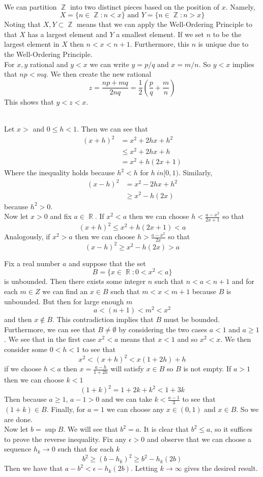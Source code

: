 \documentclass{article}
\DeclareMathOperator{\Z}{\mathbb{Z}}
\DeclareMathOperator{\R}{\mathbb{R}}
\newcommand{\problem}[1]{\noindent{\textbf{Problem #1}}\\}
\newcommand{\problempart}[1]{\noindent{\textbf{(#1)}}}
\begin{document}
\problem{9}
\problempart{b} We can partition $\Z$ into two distinct pieces based on the position of $x$. Namely,
\[
X = \{n \in \Z : n < x\} \text{ and } Y = \{n \in \Z : n > x\}
\]
Noting that $X,Y \subset \Z$ means that we can apply the Well-Ordering Principle to that $X$ has a largest element and $Y$ a smallest element. If we set $n$ to be the largest element in $X$ then $n<x<n+1$. Furthermore, this $n$ is unique due to the Well-Ordering Principle. \\
\problempart{d} For $x,y$ rational and $y < x$ we can write $y = p/q$ and $x = m/n$. So $y < x$ implies that $np < mq$. We then create the new rational 
\[
z = \frac{np+mq}{2nq} = \frac{1}{2}(\frac{p}{q} + \frac{m}{n})
\]
This shows that $y < z < x$.

\problem{10}
\problempart{a} Let $x >$ and $0 \leq h < 1$. Then we can see that
\begin{align*}
(x+h)^2 &= x^2 + 2hx + h^2 \\
&\leq x^2 + 2hx + h \\
&= x^2 + h(2x + 1)
\end{align*}
Where the inequality holds because $h^2 < h$ for $h \ in [0,1)$. Similarly,
\begin{align*}
(x-h)^2 &= x^2 - 2hx + h^2 \\
&\geq x^2 - h(2x)
\end{align*}
because $h^2 > 0$. \\
\problempart{b} Now let $x > 0$ and fix $a \in \R$. If $x^2 < a$ then we can choose $h < \frac{a - x^2}{2x+1}$ so that 
\[
(x+h)^2 \leq x^2 + h(2x+1) < a
\]
Analogously, if $x^2 > a$ then we can choose $h > \frac{a - x^2}{2x}$ so that
\[
(x-h)^2 \geq x^2 - h(2x) > a
\]

\problempart{c} Fix a real number $a$ and suppose that the set 
\[
B = \{x \in \R : 0 < x^2 < a\}
\]
is unbounded. Then there exists some integer $n$ such that $n < a < n+1$ and for each $m \in Z$ we can find an $x \in B$ such that $m < x < m+1$ because $B$ is unbounded. But then for large enough $m$
\[
a < (n+1) <  m^2 < x^2
\] 
and then $x \not\in B$. This contradiction implies that $B$ must be bounded. Furthermore, we can see that $B \neq \emptyset$ by considering the two cases $a < 1$ and $a \geq 1$. We see that in the first case $x^2 < a$ means that $x < 1$ and so $x^2 < x$. We then consider some $0 < h < 1$ to see that
\[
x^2 < (x+h)^2 < x(1+2h) + h
\]
if we choose $h < a$ then $x = \frac{a-h}{1+2h}$ will satisfy $x \in B$ so $B$ is not empty. If $a > 1$ then we can choose $k < 1$ 
\[
(1+k)^2 = 1 + 2k + k^2 < 1 + 3k
\] 
Then because $a \geq 1$, $a-1 > 0$ and we can take $k < \frac{a-1}{3}$ to see that $(1+k) \in B$. Finally, for $a = 1$ we can choose any $x \in (0,1)$ and $x \in B$. So we are done. \\
\indent Now let $b = \sup B$. We will see that $b^2 = a$. It is clear that $b^2 \leq a$, so it suffices to prove the reverse inequality. Fix any $\epsilon > 0$ and observe that we can choose a sequence $h_k \to 0$ such that for each $k$
\[
b^2 \geq (b - h_k)^2 \geq b^2 - h_k(2b)
\]
Then we have that $a - b^2 < \epsilon - h_k(2b)$. Letting $k \to \infty$ gives the desired result.
\end{document}
